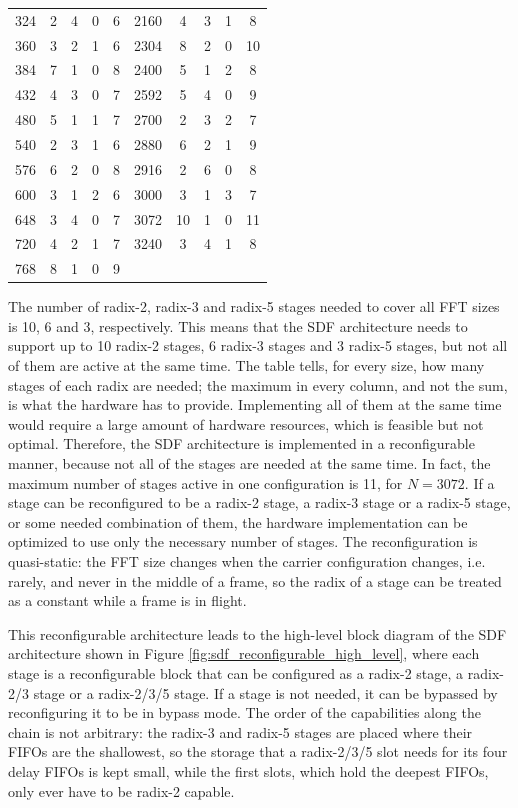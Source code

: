 \documentclass[a4paper,12pt, master]{etf}
\begin{document}
\begin{table}[H]
\begin{tabular}{c | c c c | c || c | c c c | c}
324 & 2 & 4 & 0 & 6 & 2160 & 4 & 3 & 1 & 8\\
360 & 3 & 2 & 1 & 6 & 2304 & 8 & 2 & 0 & 10\\
384 & 7 & 1 & 0 & 8 & 2400 & 5 & 1 & 2 & 8\\
432 & 4 & 3 & 0 & 7 & 2592 & 5 & 4 & 0 & 9\\
480 & 5 & 1 & 1 & 7 & 2700 & 2 & 3 & 2 & 7\\
540 & 2 & 3 & 1 & 6 & 2880 & 6 & 2 & 1 & 9\\
576 & 6 & 2 & 0 & 8 & 2916 & 2 & 6 & 0 & 8\\
600 & 3 & 1 & 2 & 6 & 3000 & 3 & 1 & 3 & 7\\
648 & 3 & 4 & 0 & 7 & 3072 & 10 & 1 & 0 & 11\\
720 & 4 & 2 & 1 & 7 & 3240 & 3 & 4 & 1 & 8\\
768 & 8 & 1 & 0 & 9 & & & & & \\
\hline
\end{tabular}
\end{table}

The number of radix-2, radix-3 and radix-5 stages needed to cover all FFT sizes is 10, 6 and 3, respectively. This means that the SDF architecture needs to support up to 10 radix-2 stages, 6 radix-3 stages and 3 radix-5 stages, but not all of them are active at the same time. The table tells, for every size, how many stages of each radix are needed; the maximum in every column, and not the sum, is what the hardware has to provide.
Implementing all of them at the same time would require a large amount of hardware resources, which is feasible but not optimal. Therefore, the SDF architecture is implemented in a reconfigurable manner, because not all of the stages are needed at the same time. In fact, the maximum number of stages active in one configuration is 11, for $N=3072$. If a stage can be reconfigured to be a radix-2 stage, a radix-3 stage or a radix-5 stage, or some needed combination of them, the hardware implementation can be optimized to use only the necessary number of stages. The reconfiguration is quasi-static: the FFT size changes when the carrier configuration changes, i.e. rarely, and never in the middle of a frame, so the radix of a stage can be treated as a constant while a frame is in flight.

This reconfigurable architecture leads to the high-level block diagram of the SDF architecture shown in Figure \ref{fig:sdf_reconfigurable_high_level}, where each stage is a reconfigurable block that can be configured as a radix-2 stage, a radix-2/3 stage or a radix-2/3/5 stage. If a stage is not needed, it can be bypassed by reconfiguring it to be in bypass mode. The order of the capabilities along the chain is not arbitrary: the radix-3 and radix-5 stages are placed where their FIFOs are the shallowest, so the storage that a radix-2/3/5 slot needs for its four delay FIFOs is kept small, while the first slots, which hold the deepest FIFOs, only ever have to be radix-2 capable.
\end{document}
